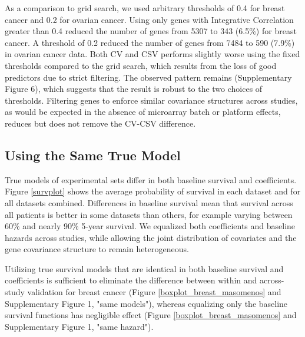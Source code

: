 \documentclass{bioinfo}
\begin{document}
  As a comparison to grid search, we used arbitrary thresholds of 0.4 for breast cancer and 0.2 for ovarian cancer. Using only genes with Integrative Correlation greater than 0.4 reduced the number of genes from 5307 to 343 (6.5\%) for breast cancer. A threshold of 0.2 reduced the number of genes 
  from 7484 to 590 (7.9\%) in ovarian cancer data. Both CV and CSV performs slightly worse using the fixed thresholds compared to the grid search, which results from the loss of good predictors due to strict filtering. The observed pattern remains (Supplementary Figure 6), which suggests that the result is robust to the two choices of thresholds. Filtering genes to enforce similar
  covariance structures across studies, as would be expected in the
  absence of microarray batch or platform effects, reduces but does not
  remove the CV-CSV difference.
  

  \subsection{Using the Same True Model}

  True models of experimental sets differ in both baseline survival and
  coefficients. Figure \ref{survplot} shows the average probability of
  survival in each dataset and for all datasets combined. Differences
  in baseline survival mean that survival across all patients is better in some
  datasets than others, for example varying between 60\% and nearly 90\% 5-year
  survival. We equalized both coefficients and baseline hazards across
  studies, while allowing the joint distribution of covariates and the gene covariance structure to
  remain heterogeneous.

  Utilizing true survival models that are identical in both
  baseline survival and coefficients is sufficient to eliminate the
  difference between within and across-study validation for breast cancer
  (Figure \ref{boxplot_breast_masomenos} and Supplementary Figure 1, "same models"), whereas
  equalizing only the baseline survival functions has negligible effect
  (Figure \ref{boxplot_breast_masomenos} and Supplementary Figure 1, "same hazard").   
  
\end{document}
